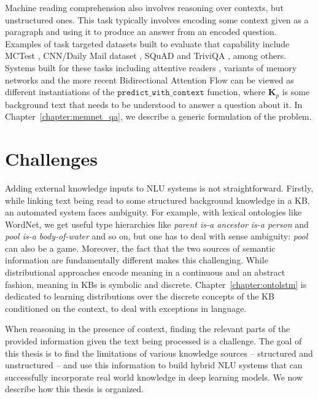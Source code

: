 Machine reading comprehension also involves reasoning over contexts, but unstructured ones. This task typically involves encoding some context given as a paragraph and using it to
produce an answer from an encoded question. Examples of task targeted datasets built to evaluate that capability include MCTest \citep{Richardson2013MCTestAC},
CNN/Daily Mail dataset \citep{hermann2015teaching}, SQuAD \citep{Rajpurkar2016SQuAD10} and TriviQA \citep{Joshi2017TriviaQAAL}, among others.
Systems built for these tasks including attentive readers \citep{hermann2015teaching}, variants of memory networks \citep{weston2014memory,Sukhbaatar2015EndToEndMN,Xiong2016DynamicMN}
and the more recent Bidirectional Attention Flow \citep{Seo2016BidirectionalAF} can be viewed as different instantiations
of the $\mathtt{predict\_with\_context}$ function, where $\textbf{K}_p$ is some background text that needs to be understood to answer a question about it. 
In Chapter~\ref{chapter:memnet_qa}, we describe a generic formulation of the problem.

\section{Challenges}

Adding external knowledge inputs to NLU systems is not straightforward.  Firstly, while linking text being read to some structured background knowledge
in a KB, an automated system faces ambiguity. For example, with lexical ontologies like WordNet, 
we get useful type hierarchies like \textit{parent is-a ancestor is-a person} and \textit{pool is-a body-of-water} 
and so on, but one has to deal with sense ambiguity: \textit{pool} can also be a game. Moreover, the fact that the two sources of semantic information are fundamentally different 
makes this challenging. While distributional approaches encode meaning in a
continuous and an abstract fashion, meaning in KBs is symbolic and discrete. Chapter~\ref{chapter:ontolstm} is dedicated to learning 
distributions over the discrete concepts of the KB conditioned on the context, to deal with exceptions in language.


When reasoning in the presence of context, finding the 
relevant parts of the provided information given the text being processed is a challenge. 
The goal of this thesis is to find the limitations of various knowledge sources -- structured and unstructured -- and use this information 
to build hybrid NLU systems that can successfully incorporate real world knowledge in deep learning models. We now describe how this thesis is organized.

